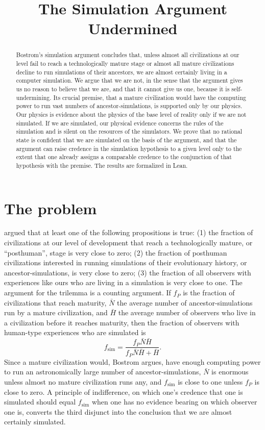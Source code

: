 \documentclass{situationist-preprint}
\title{The Simulation Argument Undermined}
\begin{document}
\maketitle

\begin{abstract}
Bostrom's simulation argument concludes that, unless almost all civilizations at our level fail to reach a technologically mature stage or almost all mature civilizations decline to run simulations of their ancestors, we are almost certainly living in a computer simulation. We argue that we are not, in the sense that the argument gives us no reason to believe that we are, and that it cannot give us one, because it is self-undermining. Its crucial premise, that a mature civilization would have the computing power to run vast numbers of ancestor-simulations, is supported only by our physics. Our physics is evidence about the physics of the base level of reality only if we are not simulated. If we are simulated, our physical evidence concerns the rules of the simulation and is silent on the resources of the simulators. We prove that no rational state is confident that we are simulated on the basis of the argument, and that the argument can raise credence in the simulation hypothesis to a given level only to the extent that one already assigns a comparable credence to the conjunction of that hypothesis with the premise. The results are formalized in Lean.
\end{abstract}

\section{The problem}

\citet{Bostrom2003} argued that at least one of the following propositions is true: (1) the fraction of civilizations at our level of development that reach a technologically mature, or \enquote{posthuman}, stage is very close to zero; (2) the fraction of posthuman civilizations interested in running simulations of their evolutionary history, or ancestor-simulations, is very close to zero; (3) the fraction of all observers with experiences like ours who are living in a simulation is very close to one. The argument for the trilemma is a counting argument. If $f_P$ is the fraction of civilizations that reach maturity, $\bar N$ the average number of ancestor-simulations run by a mature civilization, and $\bar H$ the average number of observers who live in a civilization before it reaches maturity, then the fraction of observers with human-type experiences who are simulated is
\[
f_{\mathrm{sim}} = \frac{f_P \bar N \bar H}{f_P \bar N \bar H + \bar H}.
\]
Since a mature civilization would, Bostrom argues, have enough computing power to run an astronomically large number of ancestor-simulations, $\bar N$ is enormous unless almost no mature civilization runs any, and $f_{\mathrm{sim}}$ is close to one unless $f_P$ is close to zero. A principle of indifference, on which one's credence that one is simulated should equal $f_{\mathrm{sim}}$ when one has no evidence bearing on which observer one is, converts the third disjunct into the conclusion that we are almost certainly simulated.
\end{document}
